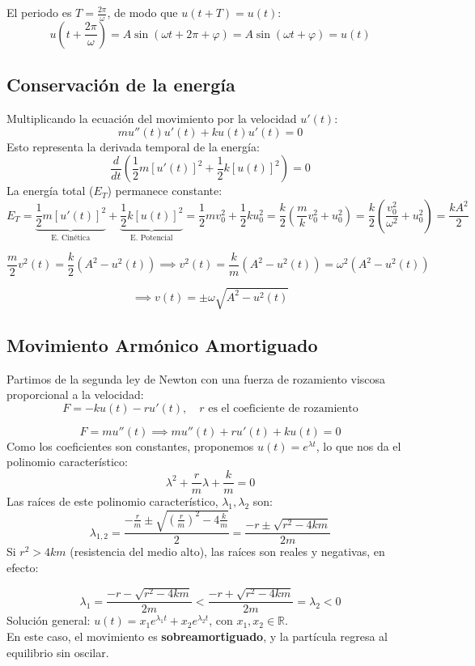 El periodo es $T = \frac{2\pi}{\omega}$, de modo que $u(t + T) = u(t)$:
\[
    u(t + \frac{2\pi}{\omega}) = A \sin(\omega t + 2\pi + \varphi) = A \sin(\omega t + \varphi) = u(t)
\]

\subsection{Conservación de la energía}

Multiplicando la ecuación del movimiento por la velocidad $u'(t)$:
\[
    m u''(t) u'(t) + k u(t) u'(t) = 0
\]
Esto representa la derivada temporal de la energía:
\[
    \frac{d}{dt} \left( \frac{1}{2} m [u'(t)]^2 + \frac{1}{2} k [u(t)]^2 \right) = 0
\]
La energía total ($E_T$) permanece constante:
\[
    E_T = \underbrace{\frac{1}{2} m [u'(t)]^2}_{\text{E. Cinética}} + \underbrace{\frac{1}{2} k [u(t)]^2}_{\text{E. Potencial}} = \frac{1}{2} m v_0^2 + \frac{1}{2} k u_0^2 = \frac{k}{2} \left( \frac{m}{k} v_0^2 + u_0^2 \right) = \frac{k}{2} \left( \frac{v_0^2}{\omega^2} + u_0^2 \right) = \frac{k A^2}{2}
\]

\[
    \frac{m}{2} v^2(t) = \frac{k}{2} (A^2 - u^2(t)) \implies v^2(t) = \frac{k}{m} \left( A^2 - u^2(t) \right) = \omega^2 (A^2 - u^2(t))
\]

\[
    \implies v(t) = \pm \omega \sqrt{A^2 - u^2(t)}
\]

\subsection{Movimiento Armónico Amortiguado}

Partimos de la segunda ley de Newton con una fuerza de rozamiento viscosa proporcional a la velocidad:
\[
    F = -k u(t) - r u'(t), \quad r \text{ es el coeficiente de rozamiento}
\]

\[
    F = m u''(t) \implies m u''(t) + r u'(t) + k u(t) = 0
\]
Como los coeficientes son constantes, proponemos $u(t) = e^{\lambda t}$, lo que nos da el polinomio característico:
\[
    \lambda^2 + \frac{r}{m} \lambda + \frac{k}{m} = 0   
\]
Las raíces de este polinomio característico, $\lambda_1, \lambda_2$ son:
\[
    \lambda_{1,2} = \frac{-\frac{r}{m} \pm \sqrt{\left(\frac{r}{m}\right)^2 - 4 \frac{k}{m}}}{2} = \frac{-r \pm \sqrt{r^2 - 4km}}{2m}
\]
Si $r^2 > 4km$ (resistencia del medio alto), las raíces son reales y negativas, en efecto:

\[
    \lambda_1 = \frac{-r - \sqrt{r^2 - 4km}}{2m} < \frac{-r+\sqrt{r^2 - 4km}}{2m} = \lambda_2 < 0
\]
Solución general: $u(t) = x_1 e^{\lambda_1 t} + x_2 e^{\lambda_2 t}$, con $x_1, x_2 \in \mathbb{R}$. \\
En este caso, el movimiento es \textbf{sobreamortiguado}, y la partícula regresa al equilibrio sin oscilar.

